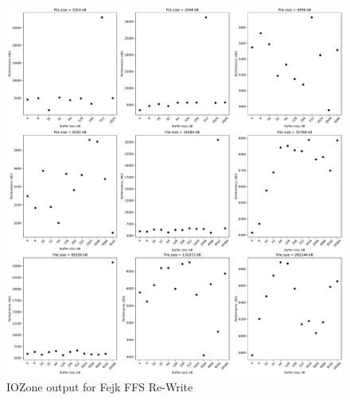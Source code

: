 \begin{figure}[!htb]
	\label{fig:bench_fffs_re_write}
	\begin{center}
		\includegraphics[width=1.0\textwidth]{figures/benchmarking/fejk-ffs/Re-Write.pdf}
	\end{center}
	\caption{IOZone output for Fejk FFS \mbox{Re-Write}}
\end{figure}

